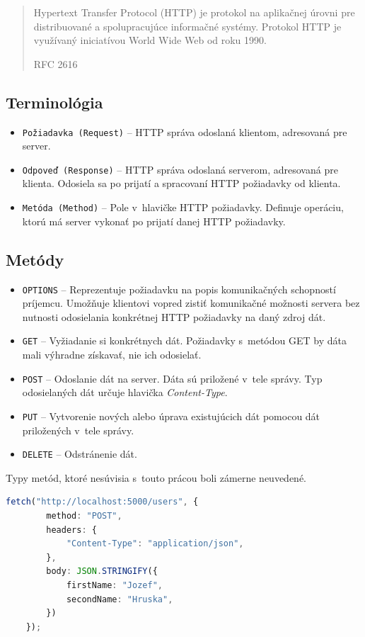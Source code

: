 \blockquote[RFC 2616 \cite{RFC_HTTP}]{Hypertext Transfer Protocol (HTTP) je protokol na aplikačnej úrovni pre distribuované a spolupracujúce informačné systémy. Protokol HTTP je využívaný iniciatívou World Wide Web od roku 1990.}
 
\subsection{Terminológia}

\begin{itemize}
	\item \texttt{Požiadavka (Request)} -- HTTP správa odoslaná klientom, adresovaná pre server.
	\item \texttt{Odpoveď (Response)} -- HTTP správa odoslaná serverom, adresovaná pre klienta. Odosiela sa po prijatí a spracovaní HTTP požiadavky od klienta.
	\item \texttt{Metóda (Method)} -- Pole v~hlavičke HTTP požiadavky. Definuje operáciu, ktorú má server vykonať po prijatí danej HTTP požiadavky.
\end{itemize}

\subsection{Metódy}
\begin{itemize}
	\item \texttt{OPTIONS} -- Reprezentuje požiadavku na popis komunikačných schopností príjemcu. Umožňuje klientovi vopred zistiť komunikačné možnosti servera bez nutnosti odosielania konkrétnej HTTP požiadavky na daný zdroj dát. \cite{MDN}
	\item \texttt{GET} -- Vyžiadanie si konkrétnych dát. Požiadavky s~metódou GET by dáta mali výhradne získavať, nie ich odosielať. \cite{MDN}
	\item \texttt{POST} -- Odoslanie dát na server. Dáta sú priložené v~tele správy. Typ odosielaných dát určuje hlavička \emph{Content-Type}. \cite{MDN}
	\item \texttt{PUT} -- Vytvorenie nových alebo úprava existujúcich dát pomocou dát priložených v~tele správy. \cite{MDN}
	\item \texttt{DELETE} -- Odstránenie dát. \cite{MDN}
\end{itemize}

\noindent Typy metód, ktoré nesúvisia s~touto prácou boli zámerne neuvedené. \\

\begin{lstlisting}[language=TypeScript, caption=Príklad odoslania HTTP POST metódy v~prostredí TypeScript.]
	fetch("http://localhost:5000/users", {
		method: "POST",
		headers: {
			"Content-Type": "application/json",
		},
		body: JSON.STRINGIFY({
			firstName: "Jozef",
			secondName: "Hruska",
		})
	});
\end{lstlisting}

